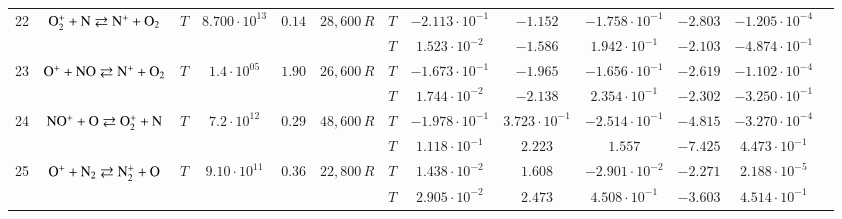 \documentclass{warpdoc}
\begin{document}
\begin{table}[!ht]
\begin{center}
\begin{threeparttable}
\begin{tabular}{ccccccccccccc}
                                          
22 & $\rm O_2^+ + N \rightleftarrows N^+ + O_2$ &$T$ & $8.700 \cdot 10^{13}$ & $0.14$ & $28,600\, R$ 
                                          &$T$  & $-2.113 \cdot 10^{-1}$  & $-1.152$  & $-1.758 \cdot 10^{-1}$ & $-2.803$ & $-1.205 \cdot 10^{-4}$ & \multirow{2}{*}{\cite{book:1990:park,ijhmt:2021:kim}} \\
 & & & & &                                &$T$  & $1.523 \cdot 10^{-2}$  & $-1.586$  & $1.942 \cdot 10^{-1}$ & $-2.103$ & $-4.874 \cdot 10^{-1}$ & ~ \\
 
                                          
23 & $\rm O^+ + NO \rightleftarrows N^+ + O_2$ &$T$ & $1.4 \cdot 10^{05}$ & $1.90$ & $26,600\, R$ 
                                          &$T$  & $-1.673 \cdot 10^{-1}$  & $-1.965$  & $-1.656 \cdot 10^{-1}$ & $-2.619$ & $-1.102 \cdot 10^{-4}$ & \multirow{2}{*}{\cite{book:1990:park,ijhmt:2021:kim}} \\
 & & & & &                                &$T$  & $1.744 \cdot 10^{-2}$  & $-2.138$  & $2.354 \cdot 10^{-1}$ & $-2.302$ & $-3.250 \cdot 10^{-1}$ & ~ \\
 
                                          
24 & $\rm NO^+ + O \rightleftarrows O_2^+ + N$ &$T$ & $7.2 \cdot 10^{12}$ & $0.29$ & $48,600\, R$ 
                                          &$T$  & $-1.978 \cdot 10^{-1}$  & $3.723 \cdot 10^{-1}$  & $-2.514 \cdot 10^{-1}$ & $-4.815$ & $-3.270 \cdot 10^{-4}$ & \multirow{2}{*}{\cite{book:1990:park,ijhmt:2021:kim}} \\
 & & & & &                                &$T$  & $1.118 \cdot 10^{-1}$  & $2.223$  & $1.557$ & $-7.425$ & $4.473 \cdot 10^{-1}$ & ~ \\
 
                                          
25 & $\rm O^+ + N_2 \rightleftarrows N_2^+ + O$ &$T$ & $9.10 \cdot 10^{11}$ & $0.36$ & $22,800\, R$ 
                                          &$T$  & $1.438 \cdot 10^{-2}$  & $1.608$  & $-2.901 \cdot 10^{-2}$ & $-2.271$ & $2.188 \cdot 10^{-5}$ & \multirow{2}{*}{\cite{book:1990:park,ijhmt:2021:kim}} \\
 & & & & &                                &$T$  & $2.905 \cdot 10^{-2}$  & $2.473$  & $4.508 \cdot 10^{-1}$ & $-3.603$ & $4.514 \cdot 10^{-1}$ & ~ \\
 

\end{tabular}
\end{threeparttable}
\end{center}
\end{table}
\end{document}
